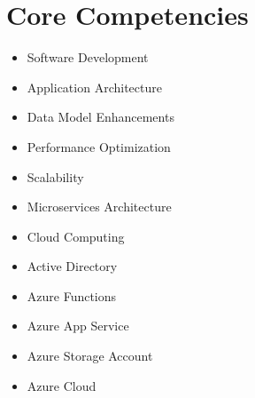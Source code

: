\section{\textbf{Core Competencies}}
\vspace{-0.5cm}
\begin{multicols}{2}
    \begin{itemize}
        \small
        \setlength{\itemsep}{0pt}
        \setlength{\parskip}{0pt}
        \setlength{\parsep}{0pt}
        \item Software Development
        \item Application Architecture
        \item Data Model Enhancements
        \item Performance Optimization
        \item Scalability
        \item Microservices Architecture
    \end{itemize}
    \columnbreak
    \begin{itemize}
        \small
        \setlength{\itemsep}{0pt}
        \setlength{\parskip}{0pt}
        \setlength{\parsep}{0pt}
        \item Cloud Computing
        \item Active Directory
        \item Azure Functions
        \item Azure App Service
        \item Azure Storage Account
        \item Azure Cloud
    \end{itemize}
\end{multicols}